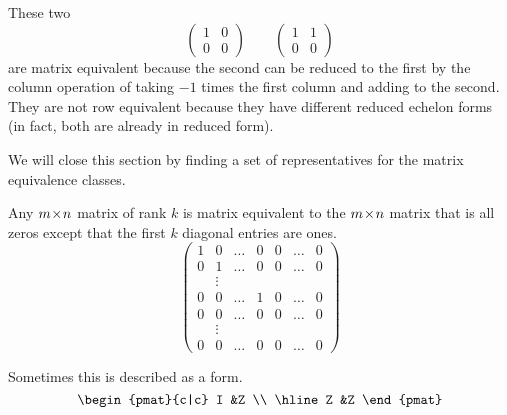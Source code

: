 \begin{example}
These two
\begin{equation*} 
  \begin{pmatrix}
    1  &0  \\
    0  &0
  \end{pmatrix}
  \qquad
  \begin{pmatrix}
    1  &1  \\
    0  &0
  \end{pmatrix}
\end{equation*}
are matrix equivalent because the second can be reduced to the first by
the column operation of taking $-1$ times the first column and adding
to the second.
They are not row equivalent because they have different reduced echelon
forms (in fact, both are already in reduced form).
\end{example}

We will close this section by finding 
a set of representatives
for the matrix equivalence classes.%

\begin{theorem}
\label{th:CanonFormForMatEquiv}
Any \( m \! \times \! n \) matrix of rank \( k \) is matrix equivalent to
the \( m \! \times \! n \) matrix that is all zeros except that
the first \( k \) diagonal entries are ones.
\begin{equation*}
    \begin{pmatrix}
      1  &0      &\ldots &0  &0  &\ldots  &0  \\
      0  &1      &\ldots &0  &0  &\ldots  &0  \\
         &\vdots                              \\
      0  &0      &\ldots &1  &0  &\ldots  &0  \\
      0  &0      &\ldots &0  &0  &\ldots  &0  \\
         &\vdots                              \\
      0  &0      &\ldots &0  &0  &\ldots  &0
    \end{pmatrix}
\end{equation*}
\end{theorem}

\noindent Sometimes this is described as a 
form.
\begin{equation*}
    \begin{pmat}{c|c}
      I  &Z  \\  \hline
      Z  &Z
    \end{pmat}
\end{equation*}

